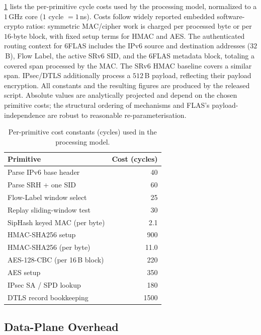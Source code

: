 \cref{tab:cyc} lists the per-primitive cycle costs used by the processing model,
normalized to a $1$\,GHz core ($1$ cycle $=1$\,ns). Costs follow widely reported
embedded software-crypto ratios: symmetric MAC/cipher work is charged per
processed byte or per $16$-byte block, with fixed setup terms for HMAC and AES.
The authenticated routing context for 6FLAS includes the IPv6 source and destination addresses ($32$\,B), Flow Label, the active SRv6 SID, and the 6FLAS
metadata block, totaling a covered span processed by the MAC. The SRv6 HMAC baseline covers a similar span. IPsec/DTLS additionally process a
$512$\,B payload, reflecting their payload encryption. All constants and the
resulting figures are produced by the released script.
Absolute values are analytically projected and depend on the chosen primitive costs;
the structural ordering of mechanisms and FLAS's payload-independence are robust
to reasonable re-parameterisation.

\begin{table}[t]
\centering
\caption{Per-primitive cost constants (cycles) used in the processing model.}
\label{tab:cyc}
\renewcommand{\arraystretch}{1.15}
\begin{tabular}{lr}
\toprule
\textbf{Primitive} & \textbf{Cost (cycles)} \\
\midrule
Parse IPv6 base header        & 40 \\
Parse SRH + one SID           & 60 \\
Flow-Label window select      & 25 \\
Replay sliding-window test    & 30 \\
SipHash keyed MAC (per byte)  & 2.1 \\
HMAC-SHA256 setup             & 900 \\
HMAC-SHA256 (per byte)        & 11.0 \\
AES-128-CBC (per 16\,B block) & 220 \\
AES setup                     & 350 \\
IPsec SA / SPD lookup         & 180 \\
DTLS record bookkeeping       & 1500 \\
\bottomrule
\end{tabular}
\end{table}

\subsection{Data-Plane Overhead}
\label{sec:results}

